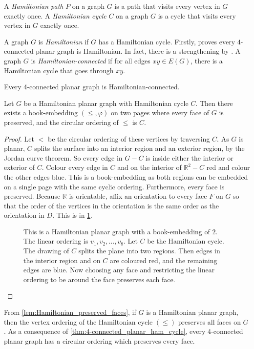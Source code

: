 A \textit{Hamiltonian path} $P$ on a graph $G$ is a path that visits every vertex in $G$ exactly once. A \textit{Hamiltonian cycle} $C$ on a graph $G$ is a cycle that visits every vertex in $G$ exactly once.  

A graph $G$ is \textit{Hamiltonian} if $G$ has a Hamiltonian cycle.
Firstly, \textcite{tutteTheoremPlanarGraphs1956} proves every $4$-connected planar graph is Hamiltonian.
In fact, there is a strengthening by \textcite{thomassenTheoremPathsPlanar1983}. A graph $G$ is \textit{Hamiltonian-connected} if for all edges $xy \in E(G)$, there is a Hamiltonian cycle that goes through $xy$. 

\begin{theorem}\label{thm:4-connected_planar_ham_cycle}
	Every 4-connected planar graph is Hamiltonian-connected.
\end{theorem}


\begin{lemma}\label{lem:Hamiltonian_preserved_faces}
	Let \(G\) be a Hamiltonian planar graph with Hamiltonian cycle $C$. Then there exists a book-embedding $(\leq, \varphi)$ on two pages where every face of $G$ is preserved, and the circular ordering of $\leq$ is $C$.
\end{lemma}

\begin{proof}
	Let \(<\) be the circular ordering of these vertices by traversing \(C\). As \(G\) is planar, \(C\) splits the surface into an interior region and an exterior region, by the Jordan curve theorem. So every edge in $G - C$ is inside either the interior or exterior of \(C\). Colour every edge in $C$ and on the interior of $\mathbb{R}^2 - C$ red and colour the other edges blue. This is a book-embedding as both regions can be embedded on a single page with the same cyclic ordering. Furthermore, every face is preserved. Because $\mathbb{R}$ is orientable, affix an orientation to every face \(F\) on $G$ so that the order of the vertices in the orientation is the same order as the orientation in \(D\). This is in \cref{fig:hamiltonian_planar}.
	\begin{figure}[h!]
		\centering
		
		\caption[Hamiltonian planar graph]{This is a Hamiltonian planar graph with a book-embedding of 2. The linear ordering is $v_1, v_2, \ldots,  v_8$. Let $C$ be the Hamiltonian cycle. The drawing of $C$ splits the plane into two regions. Then edges in the interior region and on $C$ are coloured red, and the remaining edges are blue. Now choosing any face and restricting the linear ordering to be around the face preserves each face. }\label{fig:hamiltonian_planar}
	\end{figure}
\end{proof}
From \cref{lem:Hamiltonian_preserved_faces}, if \(G\) is a Hamiltonian planar graph, then the vertex ordering of the Hamiltonian cycle \((\leq)\) preserves all faces on \(G\). As a consequence of \cref{thm:4-connected_planar_ham_cycle}, every 4-connected planar graph has a circular ordering which preserves every face.

